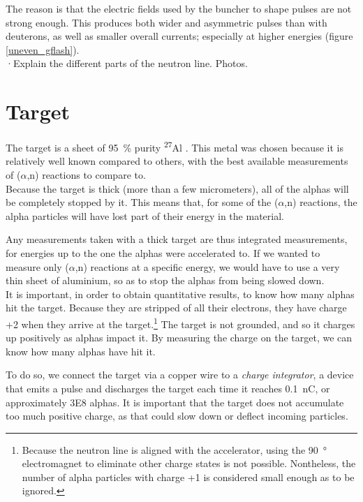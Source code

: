\documentclass[a4paper,12pt]{report}
\newcommand{\an}{($\alpha$,n) }
\newcommand{\Aliso}{\textsuperscript{27}Al }
\begin{document}
The reason is that the electric fields used by the buncher to shape pulses are not strong enough.
This produces both wider and asymmetric pulses than with deuterons, as well as smaller overall currents; especially at higher energies (figure \ref{uneven_gflash}).
\\

·Explain the different parts of the neutron line. Photos.\\

\section{Target}
The target is a sheet of \qty{95}{\percent} purity \Aliso.	%
This metal was chosen because it is relatively well known compared to others, with the best available measurements of \an reactions to compare to.
\\

Because the target is thick (more than a few micrometers), all of the alphas will be completely stopped by it.
This means that, for some of the \an reactions, the alpha particles will have lost part of their energy in the material.

Any measurements taken with a thick target are thus integrated measurements, for energies up to the one the alphas were accelerated to.
If we wanted to measure only \an reactions at a specific energy, we would have to use a very thin sheet of aluminium, so as to stop the alphas from being slowed down.
\\

It is important, in order to obtain quantitative results, to know how many alphas hit the target.
Because they are stripped of all their electrons, they have charge +2 when they arrive at the target.\footnote{Because the neutron line is aligned with the accelerator, using the \qty{90}{\degree} electromagnet to eliminate other charge states is not possible. Nontheless, the number of alpha particles with charge +1 is considered small enough as to be ignored.}
The target is not grounded, and so it charges up positively as alphas impact it.
By measuring the charge on the target, we can know how many alphas have hit it.

To do so, we connect the target via a copper wire to a \emph{charge integrator}, a device that emits a pulse and discharges the target each time it reaches \qty{0.1}{\nano\coulomb}, or approximately \num{3E8} alphas.
It is important that the target does not accumulate too much positive charge, as that could slow down or deflect incoming particles.
\end{document}
